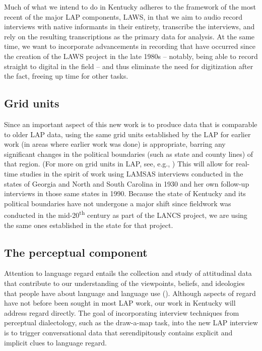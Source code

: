 \documentclass[output=paper]{langscibook}
\begin{document}
Much of what we intend to do in Kentucky adheres to the framework of the most recent of the major LAP components, LAWS, in that we aim to audio record interviews with native informants in their entirety, transcribe the interviews, and rely on the resulting transcriptions as the primary data for analysis. At the same time, we want to incorporate advancements in recording that have occurred since the creation of the LAWS project in the late 1980s – notably, being able to record straight to digital in the field – and thus eliminate the need for digitization after the fact, freeing up time for other tasks.

\subsection{Grid units} %
\label{sec:burkette:3.2}

Since an important aspect of this new work is to produce data that is comparable to older LAP data, using the same grid units established by the LAP for earlier work (in areas where earlier work was done) is appropriate, barring any significant changes in the political boundaries (such as state and county lines) of that region. (For more on grid units in LAP, see, e.g., \cites[39--40]{Kurath1973}[23--24]{Allen1973}[4]{Pederson1990}) This will allow for real-time studies in the spirit of  work using LAMSAS interviews conducted in the states of Georgia and North and South Carolina in 1930 and her own follow-up interviews in those same states in 1990. Because the state of Kentucky and its political boundaries have not undergone a major shift since fieldwork was conducted in the mid-20\textsuperscript{th} century as part of the LANCS project, we are using the same ones established in the state for that project.

\subsection{The perceptual component} %
\label{sec:burkette:3.3}
Attention to language regard entails the collection and study of attitudinal data that contribute to our understanding of the viewpoints, beliefs, and ideologies that people have about language and language use (\citealt{Preston2018, Preston2019}). Although aspects of regard have not before been sought in most LAP work, our work in Kentucky will address regard directly. The goal of incorporating interview techniques from perceptual dialectology, such as the draw-a-map task, into the new LAP interview is to trigger conversational data that serendipitously contains explicit and implicit clues to language regard.
\end{document}
